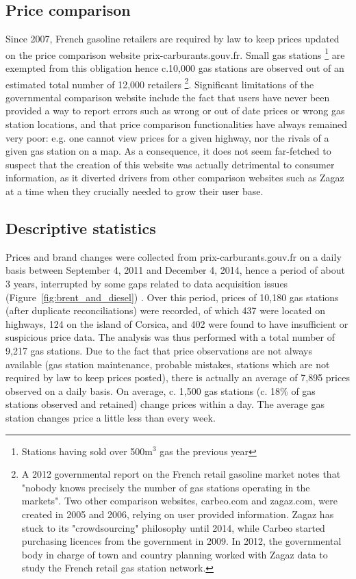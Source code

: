 \documentclass[english]{article}
\begin{document}
\subsection{Price comparison}

Since 2007, French gasoline retailers are required by law to keep prices updated on the price comparison website prix-carburants.gouv.fr. Small gas stations%
\footnote{Stations having sold over 500m$^{3}$ gas the previous year%
} are exempted from this obligation hence c.10,000 gas stations are observed out of an estimated total number of 12,000 retailers%
\footnote{A 2012 governmental report on the French retail gasoline market notes that "nobody knows precisely the number of gas stations operating in the markets". Two other comparison websites, carbeo.com and zagaz.com, were created in 2005 and 2006, relying on user provided information. Zagaz has stuck to its "crowdsourcing" philosophy until 2014, while Carbeo started purchasing licences from the government in 2009. In 2012, the governmental body in charge of town and country planning worked with Zagaz data to study the French retail gas station network.%
}.
Significant limitations of the governmental comparison website include the fact that users have never been provided a way to report errors such as wrong or out of date prices or wrong gas station locations, and that price comparison functionalities have always remained very poor: e.g. one cannot view prices for a given highway, nor the rivals of a given gas station on a map. As a consequence, it does not seem far-fetched to suspect that the creation of this website was actually detrimental to consumer information, as it diverted drivers from other comparison websites such as Zagaz at a time when they crucially needed to grow their user base.

\subsection{Descriptive statistics}

Prices and brand changes were collected from prix-carburants.gouv.fr on a daily basis between September 4, 2011 and December 4, 2014, hence a period of about 3 years, interrupted by some gaps related to data acquisition issues (Figure~\ref{fig:brent_and_diesel}) . Over this period, prices of 10,180 gas stations (after duplicate reconciliations) were recorded, of which 437 were located on highways, 124 on the island of Corsica, and 402 were found to have insufficient or suspicious price data. The analysis was thus performed with a total number of 9,217 gas stations. Due to the fact that price observations are not always available (gas station maintenance, probable mistakes, stations which are not required by law to keep prices posted), there is actually an average of 7,895 prices observed on a daily basis. On average, c. 1,500 gas stations (c. 18\% of gas stations observed and retained) change prices within a day. The average gas station changes price a little less than every week.
\end{document}
